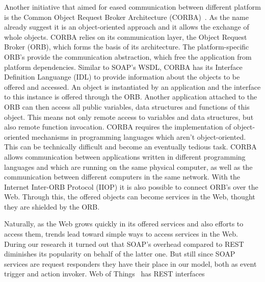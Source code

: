 Another initiative that aimed for eased communication between different platform is the Common Object Request Broker Architecture (\textrm{CORBA})~\cite{dec1991common}.
As the name already suggest it is an object-oriented approach and it allows the exchange of whole objects.
\textrm{CORBA} relies on its communication layer, the Object Request Broker (\textrm{ORB}), which forms the basis of its architecture.
The platform-specific \textrm{ORB}'s provide the communication abstraction, which free the application from platform dependencies.
Similar to \textrm{SOAP}'s \textrm{WSDL}, \textrm{CORBA} has its Interface Definition Languange (\textrm{IDL}) to provide information about the objects to be offered and accessed.
An object is instantiated by an application and the interface to this instance is offered through the \textrm{ORB}.
Another application attached to the \textrm{ORB} can then access all public variables, data structures and functions of this object.
This means not only remote access to variables and data structures, but also remote function invocation.
\textrm{CORBA} requires the implementation of object-oriented mechanisms in programming languages which aren't object-oriented.
This can be technically difficult and become an eventually tedious task.
\textrm{CORBA} allows communication between applications written in different programming languages and which are running on the same physical computer, as well as the communication between different computers in the same network.
With the Internet Inter-ORB Protocol (\textrm{IIOP}) it is also possible to connect \textrm{ORB}'s over the Web.
Through this, the offered objects can become services in the Web, thought they are shielded by the \textrm{ORB}.



Naturally, as the Web grows quickly in its offered services and also efforts to access them, trends lead toward simple ways to access services in the Web.
During our research it turned out that \textrm{SOAP}'s overhead compared to \textrm{REST} diminishes its popularity on behalf of the latter one.
But still since SOAP services are request responders they have their place in our model, both as event trigger and action invoker.
\textrm{Web of Things}~\cite{Guinard2011WoT} has REST interfaces

